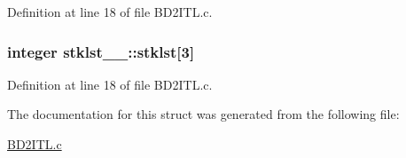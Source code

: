 Definition at line 18 of file B\+D2\+I\+T\+L.\+c.

\subsubsection[{\texorpdfstring{stklst}{stklst}}]{\setlength{\rightskip}{0pt plus 5cm}integer stklst\+\_\+\_\+\+::stklst\mbox{[}3\mbox{]}}\hypertarget{structstklst__1___adea743dfc05d4bf63ce29ff9493ed5b1}{}\label{structstklst__1___adea743dfc05d4bf63ce29ff9493ed5b1}


Definition at line 18 of file B\+D2\+I\+T\+L.\+c.



The documentation for this struct was generated from the following file\+:\begin{DoxyCompactItemize}
\item 
\hyperlink{BD2ITL_8c}{B\+D2\+I\+T\+L.\+c}\end{DoxyCompactItemize}
